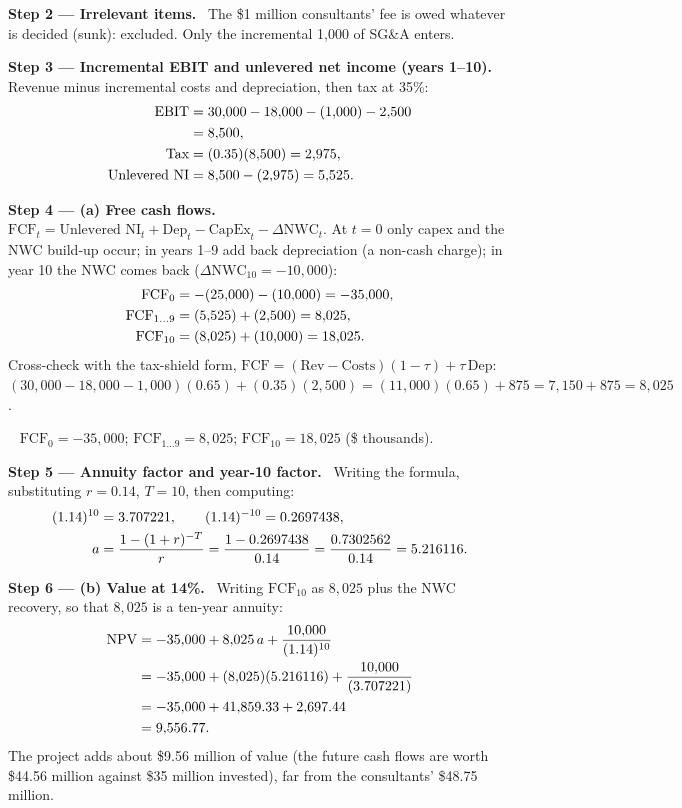 \documentclass[11pt,a4paper]{article}
\numberwithin{equation}{section}
\newcommand{\step}[2]{\par\medskip\noindent\textbf{Step #1 --- #2.}~}
\newcommand{\answer}[1]{\par\smallskip\noindent\fbox{\textbf{Answer #1.}}~}
\begin{document}
\step{2}{Irrelevant items} The \$1 million consultants' fee is owed whatever is decided (sunk):
excluded. Only the incremental 1{,}000 of SG\&A enters.

\step{3}{Incremental EBIT and unlevered net income (years 1--10)} Revenue minus incremental costs
and depreciation, then tax at 35\%:
\begin{align}
  \mathrm{EBIT} &= 30{,}000 - 18{,}000 - (1{,}000) - 2{,}500 \notag\\
                &= 8{,}500, \notag\\
  \text{Tax} &= (0.35)(8{,}500) = 2{,}975, \notag\\
  \text{Unlevered NI} &= 8{,}500 - (2{,}975) = 5{,}525. \label{eq:11ni}
\end{align}

\step{4}{(a) Free cash flows} $\mathrm{FCF}_t = \text{Unlevered NI}_t + \mathrm{Dep}_t - \mathrm{CapEx}_t - \Delta\mathrm{NWC}_t$.
At $t=0$ only capex and the NWC build-up occur; in years 1--9 add back depreciation (a non-cash
charge); in year 10 the NWC comes back ($\Delta\mathrm{NWC}_{10}=-10{,}000$):
\begin{align}
  \mathrm{FCF}_0 &= -(25{,}000) - (10{,}000) = -35{,}000, \notag\\
  \mathrm{FCF}_{1\ldots9} &= (5{,}525) + (2{,}500) = 8{,}025, \label{eq:11fcf}\\
  \mathrm{FCF}_{10} &= (8{,}025) + (10{,}000) = 18{,}025. \notag
\end{align}
Cross-check with the tax-shield form, $\mathrm{FCF}=(\text{Rev}-\text{Costs})(1-\tau)+\tau\,\mathrm{Dep}$:
$(30{,}000-18{,}000-1{,}000)(0.65)+(0.35)(2{,}500)=(11{,}000)(0.65)+875=7{,}150+875=8{,}025$.

\answer{(a)} $\mathrm{FCF}_0=-35{,}000$; $\mathrm{FCF}_{1\ldots9}=8{,}025$; $\mathrm{FCF}_{10}=18{,}025$ (\$ thousands).

\step{5}{Annuity factor and year-10 factor} Writing the formula, substituting $r=0.14$, $T=10$,
then computing:
\begin{align}
  (1.14)^{10} &= 3.707221, \qquad (1.14)^{-10} = 0.2697438, \notag\\
  a &= \frac{1-(1+r)^{-T}}{r} = \frac{1-0.2697438}{0.14} = \frac{0.7302562}{0.14} = 5.216116. \notag
\end{align}

\step{6}{(b) Value at 14\%} Writing $\mathrm{FCF}_{10}$ as $8{,}025$ plus the NWC recovery, so that
$8{,}025$ is a ten-year annuity:
\begin{align}
  \mathrm{NPV} &= -35{,}000 + 8{,}025\,a + \frac{10{,}000}{(1.14)^{10}} \notag\\
               &= -35{,}000 + (8{,}025)(5.216116) + \frac{10{,}000}{(3.707221)} \notag\\
               &= -35{,}000 + 41{,}859.33 + 2{,}697.44 \notag\\
               &= 9{,}556.77. \label{eq:11npv}
\end{align}
The project adds about \$9.56 million of value (the future cash flows are worth \$44.56 million
against \$35 million invested), far from the consultants' \$48.75 million.
\end{document}
